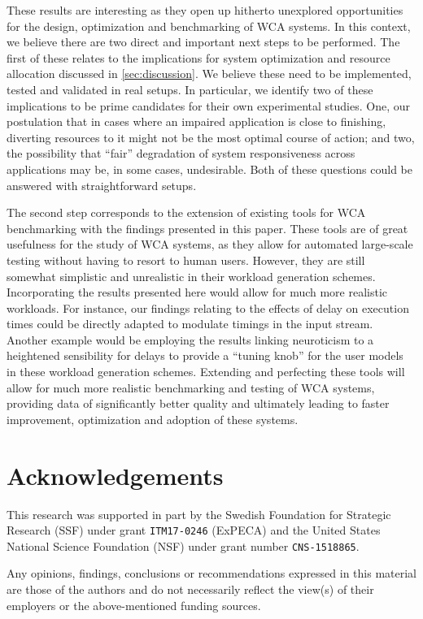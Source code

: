 \documentclass[10pt,letterpaper]{article}
\newenvironment{acks}{
  \section*{Acknowledgements}
}{}
\begin{document}
These results are interesting as they open up hitherto unexplored opportunities for the design, optimization and benchmarking of WCA systems.
In this context, we believe there are two direct and important next steps to be performed.
The first of these relates to the implications for system optimization and resource allocation discussed in \cref{sec:discussion}.
We believe these need to be implemented, tested and validated in real setups.
In particular, we identify two of these implications to be prime candidates for their own experimental studies.
One, our postulation that in cases where an impaired application is close to finishing, diverting resources to it might not be the most optimal course of action; and two, the possibility that ``fair'' degradation of system responsiveness across applications may be, in some cases, undesirable.
Both of these questions could be answered with straightforward setups.

The second step corresponds to the extension of existing tools for WCA benchmarking with the findings presented in this paper.
These tools are of great usefulness for the study of WCA systems, as they allow for automated large-scale testing without having to resort to human users.
However, they are still somewhat simplistic and unrealistic in their workload generation schemes.
Incorporating the results presented here would allow for much more realistic workloads.
For instance, our findings relating to the effects of delay on execution times could be directly adapted to modulate timings in the input stream.
Another example would be employing the results linking neuroticism to a heightened sensibility for delays to provide a ``tuning knob'' for the user models in these workload generation schemes.
Extending and perfecting these tools will allow for much more realistic benchmarking and testing of WCA systems, providing data of significantly better quality and ultimately leading to faster improvement, optimization and adoption of these systems.

\begin{acks}
  This research was supported in part by the Swedish Foundation for Strategic Research (SSF) under grant \texttt{ITM17-0246} (ExPECA) and the United States National Science Foundation (NSF) under grant number \texttt{CNS-1518865}.

  Any opinions, findings, conclusions or recommendations expressed in this material are those of the authors and do not necessarily reflect the view(s) of their employers or the above-mentioned funding sources.
\end{acks}

\nolinenumbers%

%
%
% 

\printbibliography%
\end{document}
